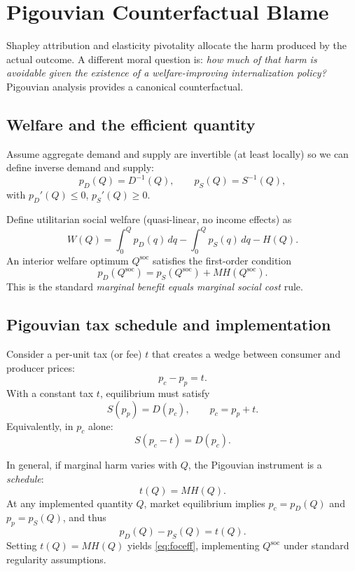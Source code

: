 \documentclass[journal, a4paper]{IEEEtran}
\begin{document}
\section{Pigouvian Counterfactual Blame}
Shapley attribution and elasticity pivotality allocate the harm produced by the actual outcome. A different moral question is: \emph{how much of that harm is avoidable given the existence of a welfare-improving internalization policy?} Pigouvian analysis provides a canonical counterfactual.

\subsection{Welfare and the efficient quantity}
Assume aggregate demand and supply are invertible (at least locally) so we can define inverse demand and supply:
\begin{equation}
p_D(Q) = D^{-1}(Q),\qquad p_S(Q)=S^{-1}(Q),
\end{equation}
with $p_D'(Q)\le 0$, $p_S'(Q)\ge 0$.

Define utilitarian social welfare (quasi-linear, no income effects) as
\begin{equation}
W(Q)=\int_0^Q p_D(q)\,dq - \int_0^Q p_S(q)\,dq - H(Q).
\label{eq:welfare}
\end{equation}
An interior welfare optimum $Q^{\text{soc}}$ satisfies the first-order condition
\begin{equation}
p_D(Q^{\text{soc}})=p_S(Q^{\text{soc}})+MH(Q^{\text{soc}}).
\label{eq:foceff}
\end{equation}
This is the standard \emph{marginal benefit equals marginal social cost} rule.

\subsection{Pigouvian tax schedule and implementation}
Consider a per-unit tax (or fee) $t$ that creates a wedge between consumer and producer prices:
\begin{equation}
p_c - p_p = t.
\end{equation}
With a constant tax $t$, equilibrium must satisfy
\begin{equation}
S(p_p)=D(p_c),\qquad p_c=p_p+t.
\end{equation}
Equivalently, in $p_c$ alone:
\begin{equation}
S(p_c-t)=D(p_c).
\label{eq:wedgeeq}
\end{equation}

In general, if marginal harm varies with $Q$, the Pigouvian instrument is a \emph{schedule}:
\begin{equation}
t(Q)=MH(Q).
\label{eq:pigtaxschedule}
\end{equation}
At any implemented quantity $Q$, market equilibrium implies $p_c=p_D(Q)$ and $p_p=p_S(Q)$, and thus
\begin{equation}
p_D(Q)-p_S(Q)=t(Q).
\end{equation}
Setting $t(Q)=MH(Q)$ yields \eqref{eq:foceff}, implementing $Q^{\text{soc}}$ under standard regularity assumptions.
\end{document}
